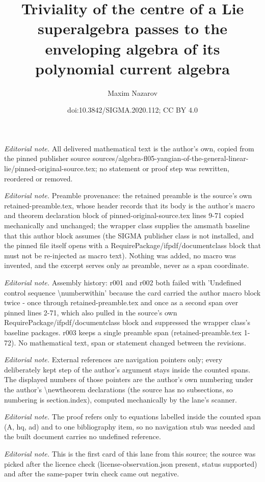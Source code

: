\documentclass[10pt,a4paper]{amsart}
\title{Triviality of the centre of a Lie superalgebra passes to the enveloping algebra of its polynomial current algebra}
\author{Maxim Nazarov}
\date{doi:10.3842/SIGMA.2020.112; CC BY 4.0}
\numberwithin{equation}{section}
\begin{document}
\maketitle
\noindent\textit{Editorial note.} All delivered mathematical text is the author's own, copied from the pinned publisher source sources/algebra-fl05-yangian-of-the-general-linear-lie/pinned-original-source.tex; no statement or proof step was rewritten, reordered or removed.\par\medskip
\noindent\textit{Editorial note.} Preamble provenance: the retained preamble is the source's own retained-preamble.tex, whose header records that its body is the author's macro and theorem declaration block of pinned-original-source.tex lines 9-71 copied mechanically and unchanged; the wrapper class supplies the amsmath baseline that this author block assumes (the SIGMA publisher class is not installed, and the pinned file itself opens with a RequirePackage/ifpdf/documentclass block that must not be re-injected as macro text). Nothing was added, no macro was invented, and the excerpt serves only as preamble, never as a span coordinate.\par\medskip
\noindent\textit{Editorial note.} Assembly history: r001 and r002 both failed with 'Undefined control sequence \textbackslash{}numberwithin' because the card carried the author macro block twice - once through retained-preamble.tex and once as a second span over pinned lines 2-71, which also pulled in the source's own RequirePackage/ifpdf/documentclass block and suppressed the wrapper class's baseline packages. r003 keeps a single preamble span (retained-preamble.tex 1-72). No mathematical text, span or statement changed between the revisions.\par\medskip
\noindent\textit{Editorial note.} External references are navigation pointers only; every deliberately kept step of the author's argument stays inside the counted spans. The displayed numbers of those pointers are the author's own numbering under the author's \textbackslash{}newtheorem declarations (the source has no subsections, so numbering is section.index), computed mechanically by the lane's scanner.\par\medskip
\noindent\textit{Editorial note.} The proof refers only to equations labelled inside the counted span (A, hq, ad) and to one bibliography item, so no navigation stub was needed and the built document carries no undefined reference.\par\medskip
\noindent\textit{Editorial note.} This is the first card of this lane from this source; the source was picked after the licence check (license-observation.json present, status supported) and after the same-paper twin check came out negative.\par\medskip
\end{document}
